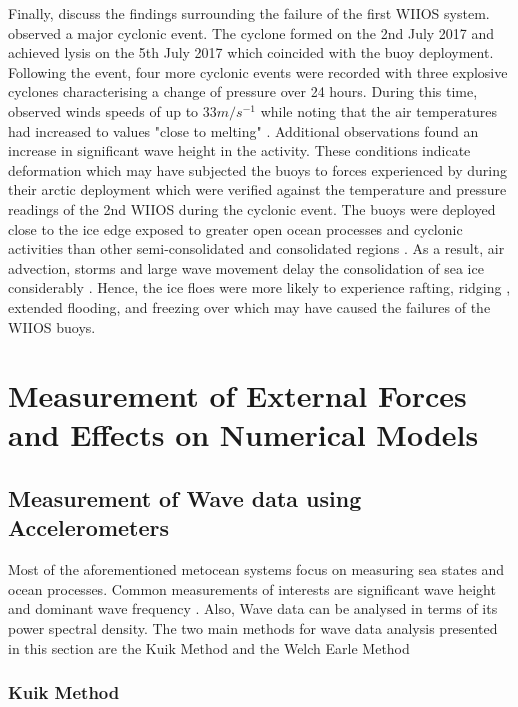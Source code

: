 Finally, \textcite{vichi2019effects} discuss the findings surrounding the failure of the first WIIOS system. \textcite{vichi2019effects} observed a major cyclonic event. The cyclone formed on the 2nd July 2017 and achieved lysis on the 5th July 2017 which coincided with the buoy deployment. Following the event, four more cyclonic events were recorded with three explosive cyclones \cite{vichi2019effects} characterising a change of pressure over 24 hours. During this time, \textcite{vichi2019effects} observed winds speeds of up to $33 m/s^{-1}$ while noting that the air temperatures had increased to values "close to melting" \cite{vichi2019effects}. Additional observations found an increase in significant wave height in the activity. These conditions indicate deformation \cite{vichi2019effects} which may have subjected the buoys to forces experienced by \cite{doble2017robust} during their arctic deployment which were verified against the temperature and pressure readings of the 2nd WIIOS during the cyclonic event. The buoys were deployed close to the ice edge exposed to greater open ocean processes and cyclonic activities than other semi-consolidated and consolidated regions \cite{vichi2019effects}. As a result, air advection, storms and large wave movement delay the consolidation of sea ice considerably \cite{vichi2019effects}. Hence, the ice floes were more likely to experience rafting, ridging \cite{icedefinition1992}, extended flooding, and freezing over which may have caused the failures of the WIIOS buoys.
\newpage
\section{Measurement of External Forces and Effects on Numerical Models}

\subsection{Measurement of Wave data using Accelerometers}

Most of the aforementioned metocean systems focus on measuring sea states and ocean processes. Common measurements of interests are significant wave height and dominant wave frequency \cite{williams2013wave}. Also, Wave data can be analysed in terms of its power spectral density. The two main methods for wave data analysis presented in this section are the Kuik Method and the Welch Earle Method

\subsubsection{Kuik Method}

